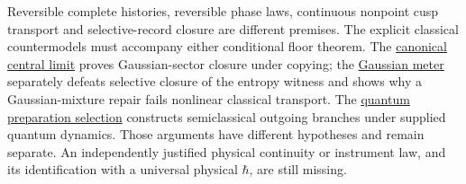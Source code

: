 \documentclass[11pt,a4paper]{article}
\begin{document}
Reversible complete histories, reversible phase laws, continuous
nonpoint cusp transport and selective-record closure are different
premises. The explicit classical countermodels must accompany either
conditional floor theorem. The
\href{central-limit-canonical-gaussian-sector.md}{canonical central
limit} proves Gaussian-sector closure under copying; the
\href{gaussian-meter-entropy-floor.md}{Gaussian meter} separately
defeats selective closure of the entropy witness and shows why a
Gaussian-mixture repair fails nonlinear classical transport. The
\href{cusp-quantum-preparation-selection.md}{quantum preparation
selection} constructs semiclassical outgoing branches under supplied
quantum dynamics. Those arguments have different hypotheses and remain
separate. An independently justified physical continuity or instrument
law, and its identification with a universal physical \(\hbar\), are
still missing.
\end{document}
